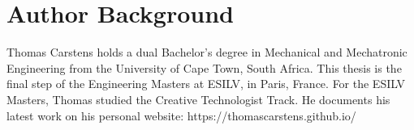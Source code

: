 \newpage
\section{Author Background}

\vspace{3cm}
Thomas Carstens holds a dual Bachelor’s degree in Mechanical and Mechatronic Engineering from the University of Cape Town, South Africa. This thesis is the final step of the Engineering Masters at ESILV, in Paris, France. For the ESILV Masters, Thomas studied the Creative Technologist Track. He documents his latest work on his personal website: {https://thomascarstens.github.io/}



